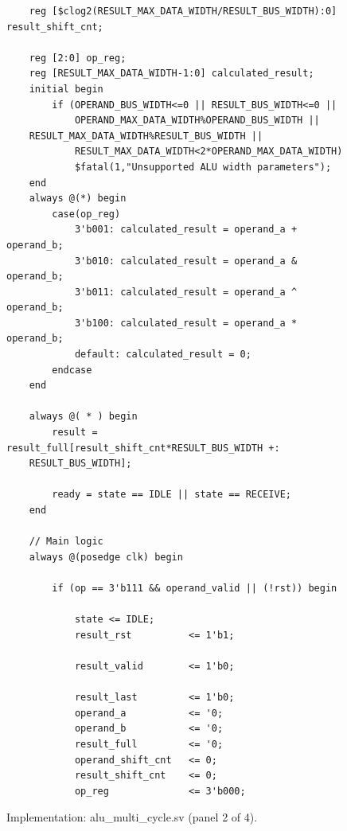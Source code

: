 \documentclass[11pt,a4paper]{article}
\begin{document}
\begin{figure}[!htbp]\begin{minipage}{\linewidth}\fontsize{10}{11.4}\selectfont\begin{verbatim}
    reg [$clog2(RESULT_MAX_DATA_WIDTH/RESULT_BUS_WIDTH):0] result_shift_cnt;

    reg [2:0] op_reg;
    reg [RESULT_MAX_DATA_WIDTH-1:0] calculated_result;
    initial begin
        if (OPERAND_BUS_WIDTH<=0 || RESULT_BUS_WIDTH<=0 ||
            OPERAND_MAX_DATA_WIDTH%OPERAND_BUS_WIDTH || 
    RESULT_MAX_DATA_WIDTH%RESULT_BUS_WIDTH ||
            RESULT_MAX_DATA_WIDTH<2*OPERAND_MAX_DATA_WIDTH)
            $fatal(1,"Unsupported ALU width parameters");
    end
    always @(*) begin
        case(op_reg)
            3'b001: calculated_result = operand_a + operand_b;
            3'b010: calculated_result = operand_a & operand_b;
            3'b011: calculated_result = operand_a ^ operand_b;
            3'b100: calculated_result = operand_a * operand_b;
            default: calculated_result = 0;
        endcase
    end

    always @( * ) begin
        result = result_full[result_shift_cnt*RESULT_BUS_WIDTH +: 
    RESULT_BUS_WIDTH];

        ready = state == IDLE || state == RECEIVE;
    end

    // Main logic
    always @(posedge clk) begin

        if (op == 3'b111 && operand_valid || (!rst)) begin

            state <= IDLE;
            result_rst          <= 1'b1;
            
            result_valid        <= 1'b0;

            result_last         <= 1'b0;
            operand_a           <= '0;
            operand_b           <= '0;
            result_full         <= '0;
            operand_shift_cnt   <= 0;
            result_shift_cnt    <= 0;
            op_reg              <= 3'b000;

\end{verbatim}\end{minipage}\caption{Implementation: alu\_multi\_cycle.sv (panel 2 of 4).}\end{figure}
\end{document}
